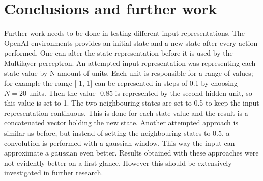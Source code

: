 
\section{Conclusions and further work}
Further work needs to be done in testing different input representations. The OpenAI environments provides an initial state and a new state after every action performed. One can alter the state representation before it is used by the Multilayer perceptron. An attempted input representation was representing each state value by N amount of units. Each unit is responsible for a range of values; for example the range [-1, 1] can be represented in steps of 0.1 by choosing $N=20$ units. Then the value -0.85 is represented by the second hidden unit, so this value is set to 1. The two neighbouring states are set to 0.5 to keep the input representation continuous. This is done for each state value and the result is a concatenated vector holding the new state. Another attempted approach is similar as before, but instead of setting the neighbouring states to 0.5, a convolution is performed with a gaussian window. This way the input can approximate a gaussian even better. Results obtained with these approaches were not evidently better on a first glance. However this should be extensively investigated in further research. 
